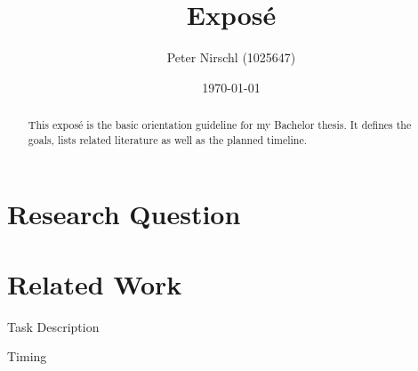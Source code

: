 \documentclass[a4paper]{article}
\title{Exposé}
\author{Peter Nirschl (1025647)}
\date{\today} %
\begin{document}
\maketitle
\begin{abstract}
This exposé is the basic orientation guideline for my Bachelor thesis.
It defines the goals, lists related literature as well as the planned timeline.
\end{abstract}
\setcounter{tocdepth}{1} %
\tableofcontents
\newpage

\section{Research Question}


\section{Related Work}
\begingroup
\renewcommand{\section}[2]{}%
\renewcommand{\refname}{}
\nocite{*}


\endgroup

\section{Title}

\section{Task Description}

\section{Methodology}


\section{Timing}
\end{document}
